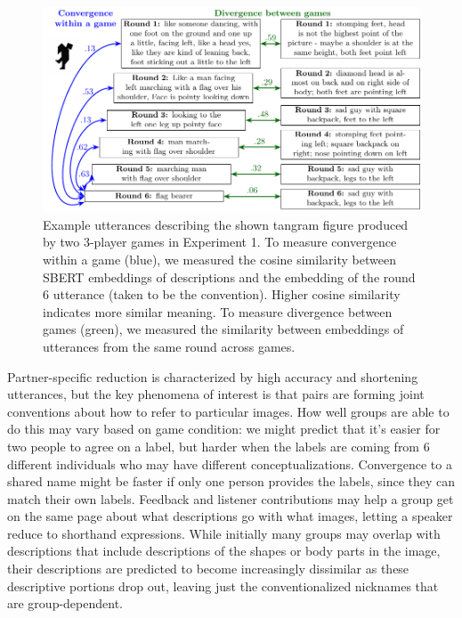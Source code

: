 \documentclass[
  english,
  a4paper,
]{article}
\begin{document}
\begin{figure}[t!]

{\centering \includegraphics[width=1\linewidth]{sbert} 

}

\caption{Example utterances describing the shown tangram figure produced by two 3-player games in Experiment 1. To measure convergence within a game (blue), we measured the cosine similarity between SBERT embeddings of descriptions and the embedding of the round 6 utterance (taken to be the convention). Higher cosine similarity indicates more similar meaning. To measure divergence between games (green), we measured the similarity between embeddings of utterances from the same round across games.}\label{fig:sbert-diagram}
\end{figure}

Partner-specific reduction is characterized by high accuracy and shortening utterances, but the key phenomena of interest is that pairs are forming joint conventions about how to refer to particular images. How well groups are able to do this may vary based on game condition: we might predict that it's easier for two people to agree on a label, but harder when the labels are coming from 6 different individuals who may have different conceptualizations. Convergence to a shared name might be faster if only one person provides the labels, since they can match their own labels. Feedback and listener contributions may help a group get on the same page about what descriptions go with what images, letting a speaker reduce to shorthand expressions. While initially many groups may overlap with descriptions that include descriptions of the shapes or body parts in the image, their descriptions are predicted to become increasingly dissimilar as these descriptive portions drop out, leaving just the conventionalized nicknames that are group-dependent.
\end{document}
